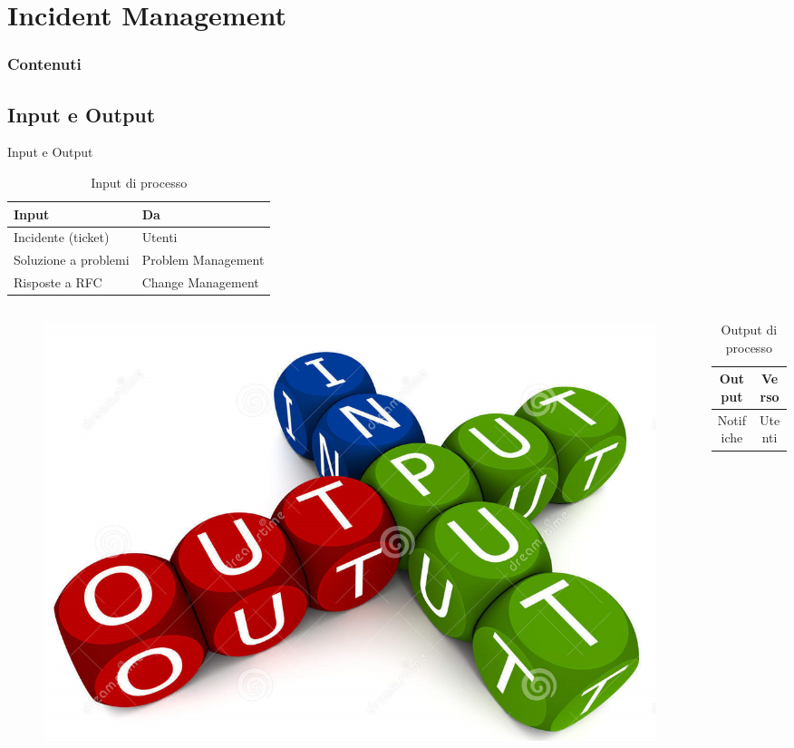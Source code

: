 %
\section{Incident Management}
\frame
{
\frametitle{Contenuti}
\tableofcontents[currentsection]
\addtocounter{framenumber}{-1}
}

\subsection*{Input e Output}
\begin{frame}{Input e Output}
\begin{table}
\begin{tabular}{ l | l }
\textbf{Input} & \textbf{Da}\\
\hline
Incidente (ticket) & Utenti\\
Soluzione a problemi & Problem Management\\
Risposte a RFC & Change Management\\
\end{tabular}
\caption{Input di processo}
\end{table}
\begin{columns}
\begin{column}{0.3\textwidth}
\begin{figure}
\includegraphics[scale=0.1]{Images/Input_output.png}
\end{figure}
\end{column}
\begin{column}{0.7\textwidth}
\begin{table}
\begin{tabular}{ c | c }
\textbf{Output} & \textbf{Verso}\\
\hline
Notifiche & Utenti\\
\end{tabular}
\caption{Output di processo}
\end{table}
\end{column}
\end{columns}
\end{frame}

